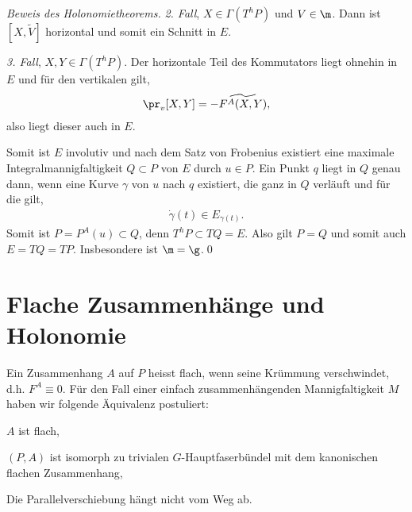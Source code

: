 \documentclass[%
	paper=a5,%
	fleqn,%
	DIV=18,%
	BCOR=0mm,
	fontsize=11pt,
	titlepage=false,%
	bibliography=totoc,
	DIV=18,%
	twoside=true,
	pdftitle=Riemannsche Geometrie,
	pdfauthor=Uwe Semmelmann,
	numbers=noendperiod]%
	{scrbook}
\begin{document}
\begin{proof}[Beweis des Holonomietheorems]
\textit{2. Fall}, $X\in \Gamma(T^hP)$ und $V\in \m$. Dann ist $[X,\tilde{V}]$ horizontal und somit ein Schnitt in $E$.

\textit{3. Fall}, $X,Y\in \Gamma(T^hP)$. Der horizontale Teil des Kommutators liegt ohnehin in $E$ und für den vertikalen gilt,
\begin{align*}
\pr_{v}[X,Y] = - \widetilde{F^A(X,Y)},
\end{align*}
also liegt dieser auch in $E$.

Somit ist $E$ involutiv und nach dem Satz von Frobenius existiert eine maximale Integralmannigfaltigkeit $Q\subset P$ von $E$ durch $u\in P$.
Ein Punkt $q$ liegt in $Q$ genau dann, wenn eine Kurve $\gamma$ von $u$ nach $q$ existiert, die ganz in $Q$  verläuft und für die gilt,
\begin{align*}
\dot{\gamma}(t) \in E_{\gamma(t)}.
\end{align*}
Somit ist $P=P^A(u)\subset Q$, denn $T^hP\subset TQ=E$. Also gilt $P=Q$ und somit auch $E=TQ=TP$. Insbesondere ist $\m = \g$.\qed
\end{proof}

\section{Flache Zusammenhänge und Holonomie}

Ein Zusammenhang $A$ auf $P$ heisst flach, wenn seine Krümmung verschwindet, d.h. $F^A\equiv 0$. 
Für den Fall einer einfach zusammenhängenden Mannigfaltigkeit $M$ haben wir folgende Äquivalenz postuliert:
\begin{equivenum}
\item $A$ ist flach,
\item $(P,A)$ ist isomorph zu trivialen $G$-Hauptfaserbündel  mit dem kanonischen flachen Zusammenhang,
\item Die Parallelverschiebung hängt nicht vom Weg ab.
\end{equivenum}
\end{document}
